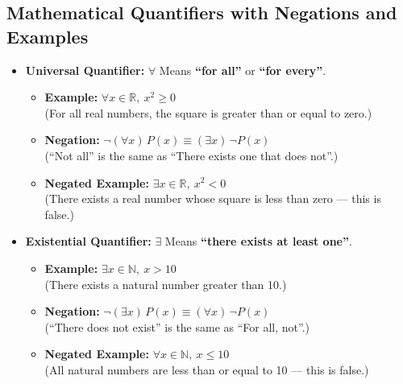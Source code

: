 \subsection{Mathematical Quantifiers with Negations and Examples}

\begin{itemize}[label=\(-\)]

	\item\textbf{Universal Quantifier:}  \(\forall\)
		Means \textbf{``for all''} or \textbf{``for every''}.

		\begin{itemize}
			\item \textbf{Example:}
\vspace{\baselineskip}
  \(\forall x \in \mathbb{R},\ x^2 \geq 0\) \\
			      (For all real numbers, the square is greater than or equal to zero.)

			\item \textbf{Negation:}  \(\neg (\forall x)\,P(x) \equiv (\exists x)\, \neg P(x)\) \\
			      (``Not all'' is the same as ``There exists one that does not''.)

			\item \textbf{Negated Example:}  \(\exists x \in \mathbb{R},\ x^2 < 0\) \\
			      (There exists a real number whose square is less than zero — this is false.)
		\end{itemize}

	\item\textbf{Existential Quantifier:}  \(\exists\)
		Means \textbf{``there exists at least one''}.

		\begin{itemize}
			\item \textbf{Example:}
\vspace{\baselineskip}
  \(\exists x \in \mathbb{N},\ x > 10\) \\
			      (There exists a natural number greater than 10.)

			\item \textbf{Negation:}  \(\neg (\exists x)\,P(x) \equiv (\forall x)\, \neg P(x)\) \\
			      (``There does not exist'' is the same as ``For all, not''.)

			\item \textbf{Negated Example:}  \(\forall x \in \mathbb{N},\ x \leq 10\) \\
			      (All natural numbers are less than or equal to 10 — this is false.)
		\end{itemize}


\end{itemize}

